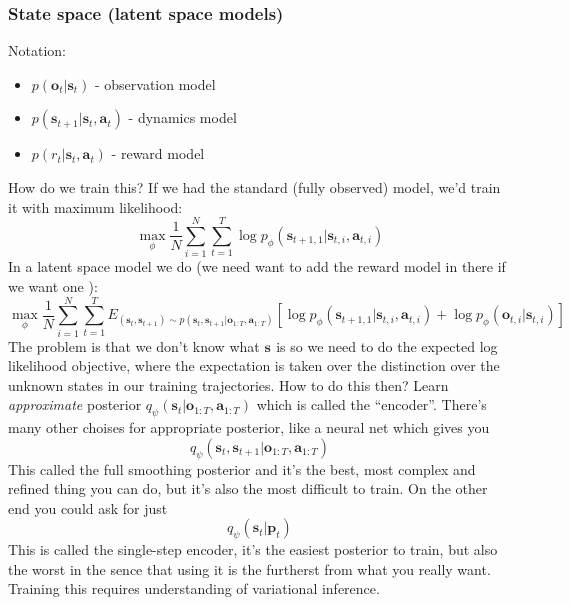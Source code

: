 \documentclass{report}
\begin{document}
\subsubsection{State space (latent space models)}
Notation: 
\begin{itemize}
		\item $p(\bm{o}_{t}|\bm{s}_{t})$ - observation model
		\item $p(\bm{s}_{t+1}|\bm{s}_{t}, \bm{a}_{t})$ - dynamics model
		\item $p(r_t|\bm{s}_{t}, \bm{a}_{t})$ - reward model
\end{itemize}
How do we train this? 
If we had the standard (fully observed) model, we'd train it with maximum likelihood:
\begin{equation}
		\max_\phi \frac{1}{N} \sum_{i=1}^{N} \sum_{t=1}^{T} \log p_\phi ( \bm{s}_{t+1,1}| \bm{s}_{t,i}, \bm{a}_{t,i})
\end{equation}
In a latent space model we do (we need want to add the reward model in there if we want one ):
\begin{equation}
		\max_\phi \frac{1}{N} \sum_{i=1}^{N} \sum_{t=1}^{T} 
		E_{(\bm{s}_{t}, \bm{s}_{t+1}) \sim p(\bm{s}_{t}, \bm{s}_{t+1}|\bm{o}_{1:T}, \bm{a}_{1:T}) } \left[ \log p_\phi ( \bm{s}_{t+1,1}| \bm{s}_{t,i}, \bm{a}_{t,i}) 
		+ \log p_\phi (\bm{o}_{t,i}| \bm{s}_{t,i}) \right] 
\end{equation}
The problem is that we don't know what $\bm{s}_{}$ is so we need to do the expected log likelihood objective,
where the expectation is taken over the distinction over the unknown states in our training trajectories.
How to do this then?
Learn \textit{approximate} posterior $q_\psi (\bm{s}_{t}|\bm{o}_{1:T}, \bm{a}_{1:T})$ which is called the ``encoder''.
There's many other choises for appropriate posterior, like a neural net which gives you
\begin{equation}
		q_\psi (\bm{s}_{t}, \bm{s}_{t+1}|\bm{o}_{1:T}, \bm{a}_{1:T})
\end{equation}
This called the full smoothing posterior and it's the best, most complex and refined thing you can do, but it's also the most difficult to train.
On the other end you could ask for just
\begin{equation}
		q_\psi (\bm{s}_{t}| \bm{p}_{t})
\end{equation}
This is called the single-step encoder, it's the easiest posterior to train, but also the worst in the sence that using it is the furtherst from what you really want.
Training this requires understanding of variational inference.
\end{document}
